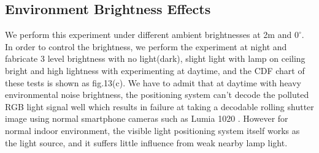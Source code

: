 \documentclass[conference]{IEEEtran}
\begin{document}
\begin{figure}
	\footnotesize
\end{figure}

\subsection{\textbf{Environment Brightness Effects}}
We perform this experiment under different ambient brightnesses at 2m and $0^{\circ}$. In order to control the brightness, we perform the experiment at night and fabricate 3 level brightness with no light(dark), slight light with lamp on ceiling bright and high lightness with experimenting at daytime, and the CDF chart of these tests is shown as fig.13(c). We have to admit that at daytime with heavy environmental noise brightness, the positioning system can't decode the polluted RGB light signal well which results in failure at taking a decodable rolling shutter image using normal smartphone cameras such as Lumia 1020 . However for normal indoor environment, the visible light positioning system itself works as the light source, and it suffers little influence from weak nearby lamp light. 
\end{document}
